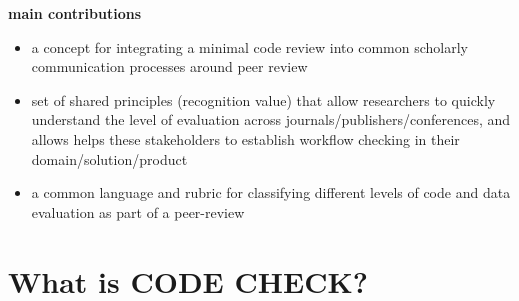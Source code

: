 \documentclass[12pt]{article}
\begin{document}
\textbf{main contributions}

\begin{itemize}
\item
  a concept for integrating a minimal code review into common scholarly
  communication processes around peer review
\item
  set of shared principles (recognition value) that allow researchers to
  quickly understand the level of evaluation across
  journals/publishers/conferences, and allows helps these stakeholders
  to establish workflow checking in their domain/solution/product
\item
  a common language and rubric for classifying different levels of code
  and data evaluation as part of a peer-review
\end{itemize}

\section*{What is CODE CHECK?}\label{what-is-code-check}
\end{document}
